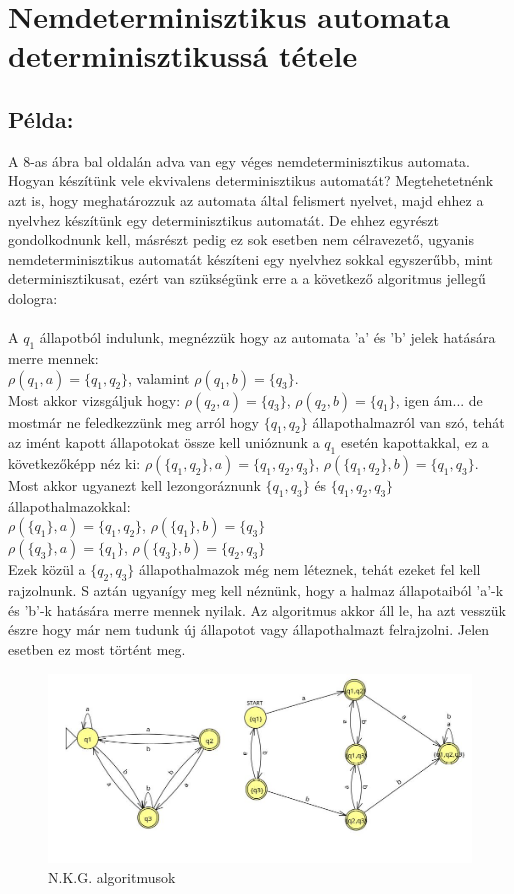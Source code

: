 \documentclass[12pt]{article}
\begin{document}
\section{Nemdeterminisztikus automata determinisztikussá tétele}
\subsection{Példa:}
A 8-as ábra bal oldalán adva van egy véges nemdeterminisztikus automata. Hogyan készítünk vele ekvivalens
determinisztikus automatát? Megtehetetnénk azt is, hogy meghatározzuk az automata által felismert nyelvet, majd
ehhez a nyelvhez készítünk egy determinisztikus automatát. De ehhez egyrészt gondolkodnunk kell, másrészt pedig
ez sok esetben nem célravezető, ugyanis nemdeterminisztikus automatát készíteni egy nyelvhez sokkal egyszerűbb,
mint determinisztikusat, ezért van szükségünk erre a a következő algoritmus jellegű dologra:\\\\
A $q_1$ állapotból indulunk, megnézzük hogy az automata 'a' és 'b' jelek hatására merre mennek:\\
$\rho (q_1,a)=\{q_1,q_2\}$, valamint $\rho (q_1,b)=\{q_3\}$. \\ 
Most akkor vizsgáljuk hogy: $\rho (q_2,a)=\{q_3\}$, $\rho (q_2,b)=\{q_1\}$, igen ám...
de mostmár ne feledkezzünk meg arról hogy $\{q_1,q_2\}$ állapothalmazról van szó, tehát az imént kapott
állapotokat össze kell unióznunk a $q_1$ esetén kapottakkal, ez a következőképp néz ki:
$\rho(\{q_1,q_2\},a)=\{q_1,q_2,q_3\}$, $\rho(\{q_1,q_2\},b)=\{q_1,q_3\}$.
Most akkor ugyanezt kell lezongoráznunk $\{q_1,q_3\}$ és $\{q_1,q_2,q_3\}$ állapothalmazokkal:\\
$\rho(\{q_1\},a)=\{q_1,q_2\}$, $\rho(\{q_1\},b)=\{q_3\}$\\
$\rho(\{q_3\},a)=\{q_1\}$, $\rho(\{q_3\},b)=\{q_2,q_3\}$\\ 
Ezek közül a $\{q_2,q_3\}$ állapothalmazok még nem léteznek, tehát ezeket fel kell rajzolnunk.
S aztán ugyanígy meg kell néznünk, hogy a halmaz állapotaiból 'a'-k és 'b'-k hatására merre mennek nyilak.
Az algoritmus akkor áll le, ha azt vesszük észre hogy már nem tudunk új állapotot vagy állapothalmazt felrajzolni.
Jelen esetben ez most történt meg.

\begin{figure}[h]
  \centering
  \includegraphics[width=0.7\linewidth]{img/nemdet_to_det.jpg} 
  \caption{N.K.G. algoritmusok}
  \label{fig:your_label}
\end{figure}
\end{document}
